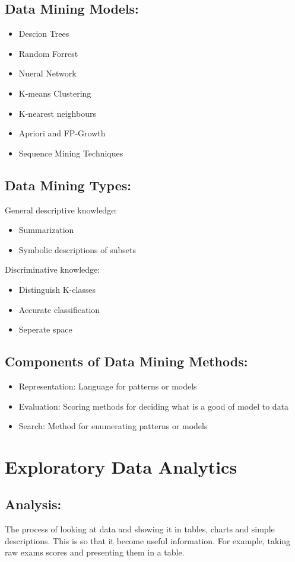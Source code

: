\documentclass[a5paper]{article}
\begin{document}
	\subsection{Data Mining Models:}
	\begin{itemize}
		\item Descion Trees
		\item Random Forrest
		\item Nueral Network
		\item K-means Clustering
		\item K-nearest neighbours
		\item Apriori and FP-Growth
		\item Sequence Mining Techniques
	\end{itemize}
	\subsection{Data Mining Types:}
	General descriptive knowledge:
	\begin{itemize}
		\item Summarization
		\item Symbolic descriptions of subsets
	\end{itemize}
	Discriminative knowledge:
	\begin{itemize}
		\item Distinguish K-classes
		\item Accurate classification
		\item Seperate space
	\end{itemize}
	\subsection{Components of Data Mining Methods:}
	\begin{itemize}
		\item Representation: Language for patterns or models
		\item Evaluation: Scoring methods for deciding what is a good of model to data
		\item Search: Method for enumerating patterns or models
	\end{itemize}

	\section{Exploratory Data Analytics}
	\subsection{Analysis:}
	The process of looking at data and showing it in tables, charts and simple descriptions. This is so that it become useful information. For example, taking raw exams scores and presenting them in a table.
\end{document}
